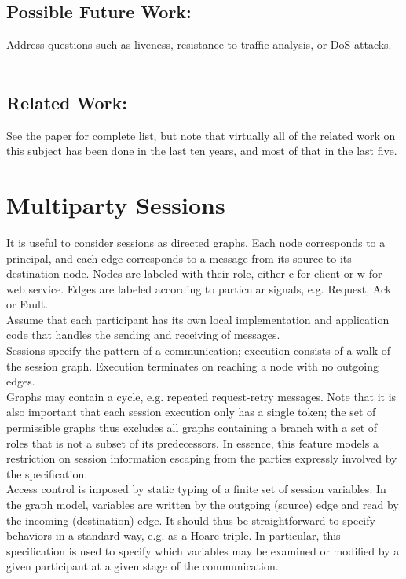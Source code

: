 \documentclass[a4paper,10pt]{article}
\begin{document}
\subsection{Possible Future Work:}
Address questions such as liveness, resistance to traffic analysis, or DoS attacks.\\
\\
\subsection{Related Work:} See the paper for complete list, but note that virtually all of the related work
on this subject has been done in the last ten years, and most of that in the last five.


\section{Multiparty Sessions}

It is useful to consider sessions as directed graphs.  Each node corresponds to a principal,
and each edge corresponds to a message from its source to its destination node.  Nodes are labeled
with their role, either \textsf{c} for client or \textsf{w} for web service.  Edges are labeled
according to particular signals, e.g. \textsf{Request}, \textsf{Ack} or \textsf{Fault}.\\

Assume that each participant has its own local implementation and application code that handles the
sending and receiving of messages.\\

Sessions specify the pattern of a communication; execution consists of a walk of the session graph.
Execution terminates on reaching a node with no outgoing edges.\\

Graphs may contain a cycle, e.g. repeated request-retry messages.  Note that it is also important that
each session execution only has a single token; the set of permissible graphs thus excludes all graphs
containing a branch with a set of roles that is not a subset of its predecessors.  In essence, this
feature models a restriction on session information escaping from the parties expressly involved
by the specification.\\

Access control is imposed by static typing of a finite set of session variables.  In the graph
model, variables are written by the outgoing (source) edge and read by the incoming (destination) edge.
It should thus be straightforward to specify behaviors in a standard way, e.g. as a Hoare triple.
In particular, this specification is used to specify which variables may be examined or modified
by a given participant at a given stage of the communication.\\
\end{document}

